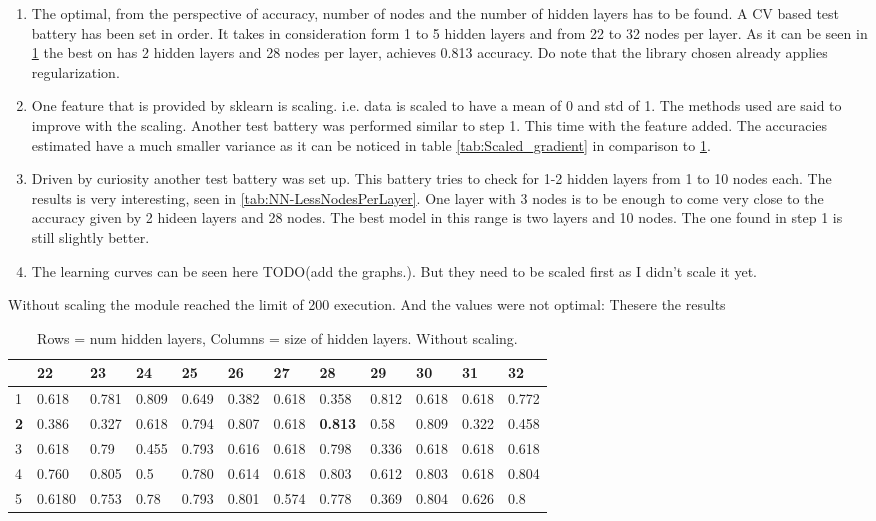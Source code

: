 \documentclass{article}
\begin{document}
\begin{enumerate}
	\item The optimal, from the perspective of accuracy, number of nodes and the number of hidden layers has to be found. A CV based test battery has been set in order. It takes in consideration form 1 to 5 hidden layers and from 22 to 32 nodes per layer. As it can be seen in \ref{tab:sklearn-NoScaling} the best on has 2 hidden layers and 28 nodes per layer, achieves 0.813 accuracy. Do note that the library chosen already applies regularization.
	\item One feature that is provided by sklearn is scaling. i.e. data is scaled to have a mean of 0 and std of 1. The methods used are said to improve with the scaling. Another test battery was performed similar to step 1. This time with the feature added. The accuracies estimated have a much smaller variance as it can be noticed in table \ref{tab:Scaled_gradient} in comparison to  \ref{tab:sklearn-NoScaling}.
	\item Driven by curiosity another test battery was set up. This battery tries to check for 1-2 hidden layers from 1 to 10 nodes each. The results is very interesting, seen in \ref{tab:NN-LessNodesPerLayer}. One layer with 3 nodes is to be enough to come very close to the accuracy given by 2 hideen layers and 28 nodes. The best model in this range is two layers and 10 nodes. The one found in step 1 is still slightly better.
	\item The learning curves can be seen here TODO(add the graphs.). But they need to be scaled first as I didn't scale it yet. 
\end{enumerate}


Without scaling the module reached the limit of 200 execution. And the values
were not optimal: 
Thesere the results 

\begin{table}[]
\caption{Rows = num hidden layers, Columns = size of hidden layers. Without scaling.}
\label{tab:sklearn-NoScaling}
\begin{tabular}{|l|l|l|l|l|l|l|l|l|l|l|l|}
\hline
           & 22       & 23       & 24       & 25       & 26       & 27       & \textbf{28}       & 29       & 30       & 31       & 32       \\ \hline
1          & 0.618 & 0.781 & 0.809 & 0.649 & 0.382 & 0.618 & 0.358          & 0.812 & 0.618 & 0.618 & 0.772 \\ \hline
\textbf{2} & 0.386 & 0.327 & 0.618 & 0.794 & 0.807 & 0.618 & \textbf{0.813} & 0.58 & 0.809 & 0.322 & 0.458 \\ \hline
3          & 0.618 & 0.79 & 0.455 & 0.793 & 0.616 & 0.618 & 0.798          & 0.336 & 0.618 & 0.618 & 0.618 \\ \hline
4          & 0.760 & 0.805 & 0.5 & 0.780 & 0.614 & 0.618 & 0.803          & 0.612 & 0.803 & 0.618 & 0.804 \\ \hline
5          & 0.6180 & 0.753 & 0.78 & 0.793 & 0.801 & 0.574 & 0.778          & 0.369 & 0.804 & 0.626 & 0.8 \\ \hline
\end{tabular}
\end{table}
\end{document}
